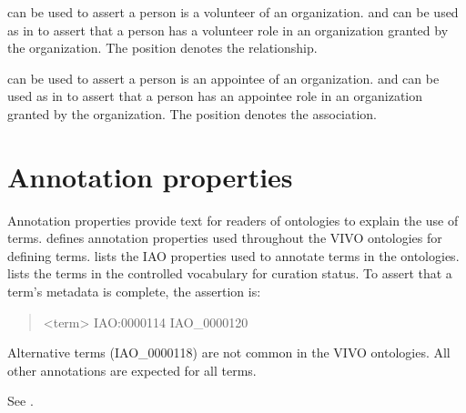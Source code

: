 \documentclass[letterpaper,10pt,english]{sphinxmanual}
\begin{document}
\sphinxAtStartPar
{} can be used to assert a person is a volunteer of an
organization.   and
 can be used as in {\hyperref[\detokenize{associations:figure-5}]{}} to assert
that a person has a volunteer role in an organization granted by the organization.
The position denotes the relationship.

\sphinxAtStartPar
{} can be used to assert a person is an appointee of an
organization.   and
 can be used as in {\hyperref[\detokenize{associations:figure-5}]{}} to assert
that a person has an appointee role in an organization granted by the organization.
The position denotes the association.


\chapter{Annotation properties}
\label{\detokenize{annotation-properties:annotation-properties}}\label{\detokenize{annotation-properties::doc}}
\sphinxAtStartPar
Annotation properties provide text for readers of ontologies to explain the
use of terms.   defines annotation properties used throughout the VIVO ontologies
for defining terms.  {\hyperref[\detokenize{classes:table-5}]{}} lists the IAO properties used to annotate terms in the
ontologies.  {\hyperref[\detokenize{annotation-properties:table-6}]{}} lists the terms in the controlled vocabulary for curation
status.  To assert that a term’s metadata is complete, the assertion is:
\begin{quote}

\sphinxAtStartPar
\textless{}term\textgreater{} IAO:0000114 IAO\_0000120
\end{quote}

\sphinxAtStartPar
Alternative terms (IAO\_0000118) are not common in the VIVO ontologies.  All other
annotations are expected for all terms.

\sphinxAtStartPar
See {\hyperref[\detokenize{annotation-properties:table-6}]{}}.
\end{document}
